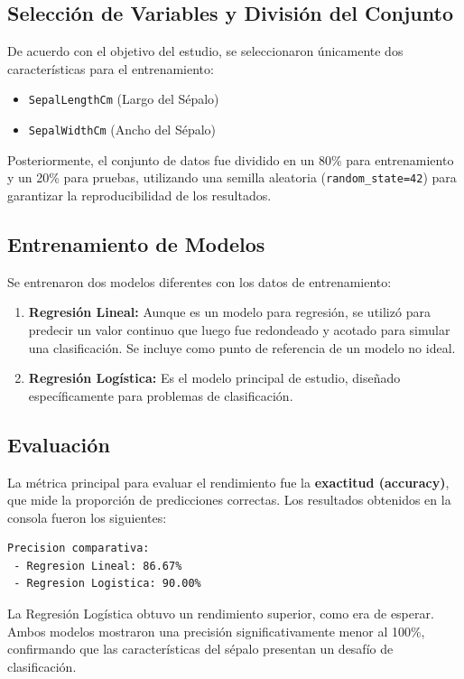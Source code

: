 \documentclass[12pt,a4paper]{article}
\begin{document}
\subsection{Selección de Variables y División del Conjunto}
De acuerdo con el objetivo del estudio, se seleccionaron únicamente dos características para el entrenamiento:
\begin{itemize}
    \item \texttt{SepalLengthCm} (Largo del Sépalo)
    \item \texttt{SepalWidthCm} (Ancho del Sépalo)
\end{itemize}
Posteriormente, el conjunto de datos fue dividido en un 80\% para entrenamiento y un 20\% para pruebas, utilizando una semilla aleatoria (\texttt{random\_state=42}) para garantizar la reproducibilidad de los resultados.

\subsection{Entrenamiento de Modelos}
Se entrenaron dos modelos diferentes con los datos de entrenamiento:
\begin{enumerate}
    \item \textbf{Regresión Lineal:} Aunque es un modelo para regresión, se utilizó para predecir un valor continuo que luego fue redondeado y acotado para simular una clasificación. Se incluye como punto de referencia de un modelo no ideal.
    \item \textbf{Regresión Logística:} Es el modelo principal de estudio, diseñado específicamente para problemas de clasificación.
\end{enumerate}

\subsection{Evaluación}
La métrica principal para evaluar el rendimiento fue la \textbf{exactitud (accuracy)}, que mide la proporción de predicciones correctas. Los resultados obtenidos en la consola fueron los siguientes:

\begin{lstlisting}[caption={Salida de Precisión de los Modelos}, label=list:accuracy]
  Precision comparativa:
 - Regresion Lineal: 86.67%
 - Regresion Logistica: 90.00%
\end{lstlisting}

La Regresión Logística obtuvo un rendimiento superior, como era de esperar. Ambos modelos mostraron una precisión significativamente menor al 100\%, confirmando que las características del sépalo presentan un desafío de clasificación.
\end{document}
